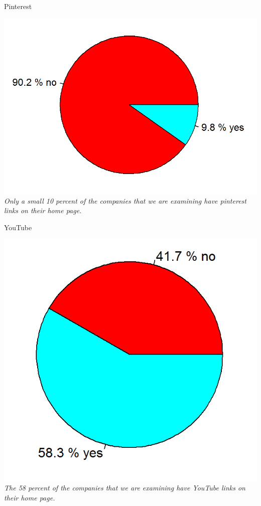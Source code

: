\documentclass{article}
\begin{document}
\begin{table}[H]
\centering
\caption{Pinterest}
\begin{center}
\includegraphics[scale=0.6]{../R/photos/16_pint_dist.png}  \\
\textit{Only a small 10 percent of the companies that we are examining have pinterest links on their home page.}
\end{center}
\end{table}

\begin{table}[H]
\centering
\caption{YouTube}
\begin{center}
\includegraphics[scale=0.6]{../R/photos/18_yt_dist.png}  \\
\textit{The 58 percent of the companies that we are examining have YouTube links on their home page.}
\end{center}
\end{table}
\end{document}
